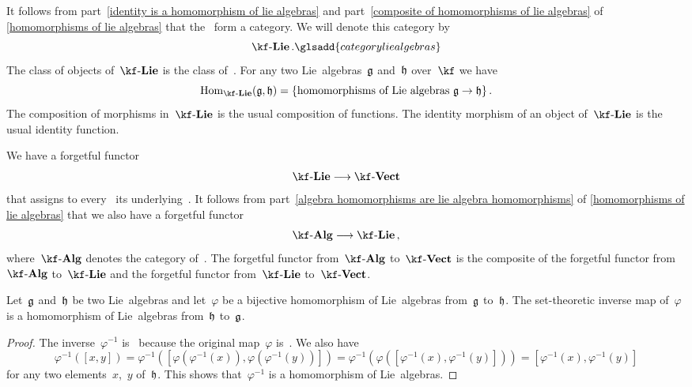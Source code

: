 \begin{remark}
	It follows from part~\ref{identity is a homomorphism of lie algebras} and part~\ref{composite of homomorphisms of lie algebras} of \cref{homomorphisms of lie algebras} that the~\liealgebras{$\kf$} form a category.
	We will denote this category by
	\[
		\cLie{\kf} \,.
		\glsadd{category lie algebras}
	\]
	The class of objects of~$\cLie{\kf}$ is the class of~\liealgebras{$\kf$}.
	For any two Lie~algebras~$\mathfrak{g}$ and~$\mathfrak{h}$ over~$\kf$ we have
	\[
		\Hom_{\cLie{\kf}}(\glie, \hlie)
		=
		\{
			\text{homomorphisms of Lie~algebras~$\textstyle \glie \to \hlie$} 
		\} \,.
	\]
	The composition of morphisms in~$\cLie{\kf}$ is the usual composition of functions.
	The identity morphism of an object of~$\cLie{\kf}$ is the usual identity function.

	We have a forgetful functor
	\[
		\cLie{\kf}
		\to
		\cVect{\kf}
	\]
	that assigns to every~\liealgebra{$\kf$} its underlying~\vectorspace{$\kf$}.
	It follows from part~\ref{algebra homomorphisms are lie algebra homomorphisms} of \cref{homomorphisms of lie algebras} that we also have a forgetful functor
	\[
		\cAlg{\kf}
		\to
		\cLie{\kf} \,,
	\]
	where~$\cAlg{\kf}$ denotes the category of~\algebras{$\kf$}.
	The forgetful functor from~$\cAlg{\kf}$ to~$\cVect{\kf}$ is the composite of the forgetful functor from~$\cAlg{\kf}$ to~$\cLie{\kf}$ and the forgetful functor from~$\cLie{\kf}$ to~$\cVect{\kf}$.
\end{remark}


\begin{proposition}
	\label{inverse of homomorphism of lie algebras is again a homomorphism of lie algebras}
	Let~$\mathfrak{g}$ and~$\mathfrak{h}$ be two Lie~algebras and let~$\varphi$ be a bijective homomorphism of Lie~algebras from~$\mathfrak{g}$ to~$\mathfrak{h}$.
	The set-theoretic inverse map of~$\varphi$ is a homomorphism of Lie~algebras from~$\mathfrak{h}$ to~$\mathfrak{g}$.
\end{proposition}


\begin{proof}
	The inverse~$\varphi^{-1}$ is~\linear{$\kf$} because the original map~$\varphi$ is~\linear{$\kf$}.
	We also have
	\[
		\varphi^{-1}( [x,y] )
		=
		\varphi^{-1}( [ \varphi(\varphi^{-1}(x)), \varphi(\varphi^{-1}(y)) ] )
		=
		\varphi^{-1}( \varphi( [ \varphi^{-1}(x), \varphi^{-1}(y) ] ) )
		=
		[ \varphi^{-1}(x), \varphi^{-1}(y) ]
	\]
	for any two elements~$x$,~$y$ of~$\mathfrak{h}$.
	This shows that~$\varphi^{-1}$ is a homomorphism of Lie~algebras.
\end{proof}


